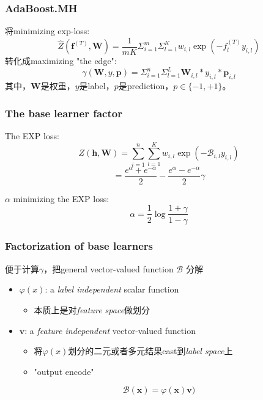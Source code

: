 \documentclass{beamer}
\begin{document}
\begin{frame}
\frametitle{AdaBoost.MH}
将minimizing exp-loss:
$$\hat{Z}(\mathbf{f}^{(T)}, \mathbf{W}) = \frac{1}{mK} {{\Sigma}_{i=1}^m} {{\Sigma}_{l=1}^K} {w_{i,l}\exp(- f_l^{(T)} y_{i,l})}$$
转化成maximizing "the edge":
$$ \gamma(\mathbf{W}, y, \mathbf{p}) = \Sigma_{i=1}^{n} \Sigma_{l=1}^{L} \mathbf{W}_{i,l} * y_{i,l} * \mathbf{p}_{i, l}$$
其中，$\mathbf{W}$是权重，$y$是label，$p$是prediction，$p \in \{-1, +1\}$。
\end{frame}

\begin{frame}
\frametitle{The base learner factor}
\begin{block}{The EXP loss:}
$$Z(\mathbf{h}, \mathbf{W}) = \sum_{i=1}^{n} \sum_{l=1}^{K} w_{i,l} \exp(-\mathcal{B}_{i,l} y_{i,l}) $$
$$= \frac{e^\alpha + e^{-\alpha}}{2} - \frac{e^\alpha - e^{-\alpha}}{2} \gamma$$
\end{block}
\begin{block}{$\alpha$ minimizing the EXP loss:}
$$\alpha = \frac{1}{2} \log \frac{1+\gamma}{1-\gamma}$$
\end{block}
\end{frame}

\begin{frame}
\frametitle{Factorization of base learners}
便于计算$\gamma$，把general vector-valued function $\mathcal{B}$ 分解
\begin{itemize}
\item $\varphi(x)$: a \textit{label independent} scalar function
\begin{itemize}
  \item 本质上是对\textit{feature space}做划分
\end{itemize}
\item $\mathbf{v}$: a \textit{feature independent} vector-valued function
\begin{itemize}
  \item 将$\varphi(x)$划分的二元或者多元结果cast到\textit{label space}上
  \item "output encode"
\end{itemize}
\end{itemize}

$$\mathcal{B}(\mathbf{x}) = \varphi(\mathbf{x}) \mathbf{v})$$

\end{frame}
\end{document}

